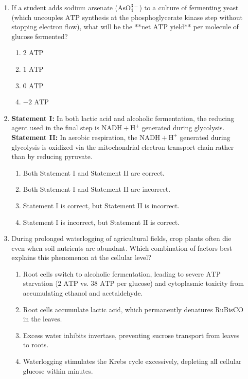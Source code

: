 \documentclass[11pt, a4paper]{article}
\begin{document}
\begin{enumerate}[label=\textbf{\arabic*.}]
\item If a student adds sodium arsenate ($\text{AsO}_4^{3-}$) to a culture of fermenting yeast (which uncouples $\text{ATP}$ synthesis at the phosphoglycerate kinase step without stopping electron flow), what will be the **net $\text{ATP}$ yield** per molecule of glucose fermented?
\begin{enumerate}[label=(\Alph*)]
    \item $2\text{ ATP}$
    \item $1\text{ ATP}$
    \item $0\text{ ATP}$
    \item $-2\text{ ATP}$
\end{enumerate}

\item \textbf{Statement I:} In both lactic acid and alcoholic fermentation, the reducing agent used in the final step is $\text{NADH} + \text{H}^+$ generated during glycolysis. \\
\textbf{Statement II:} In aerobic respiration, the $\text{NADH} + \text{H}^+$ generated during glycolysis is oxidized via the mitochondrial electron transport chain rather than by reducing pyruvate.
\begin{enumerate}[label=(\Alph*)]
    \item Both Statement I and Statement II are correct.
    \item Both Statement I and Statement II are incorrect.
    \item Statement I is correct, but Statement II is incorrect.
    \item Statement I is incorrect, but Statement II is correct.
\end{enumerate}

\item During prolonged waterlogging of agricultural fields, crop plants often die even when soil nutrients are abundant. Which combination of factors best explains this phenomenon at the cellular level?
\begin{enumerate}[label=(\Alph*)]
    \item Root cells switch to alcoholic fermentation, leading to severe $\text{ATP}$ starvation ($2\text{ ATP}$ vs. $38\text{ ATP}$ per glucose) and cytoplasmic toxicity from accumulating ethanol and acetaldehyde.
    \item Root cells accumulate lactic acid, which permanently denatures RuBisCO in the leaves.
    \item Excess water inhibits invertase, preventing sucrose transport from leaves to roots.
    \item Waterlogging stimulates the Krebs cycle excessively, depleting all cellular glucose within minutes.
\end{enumerate}


\end{enumerate}
\end{document}
